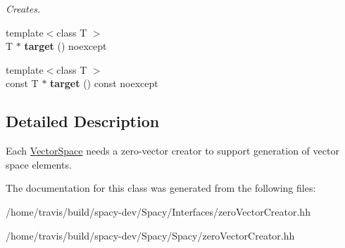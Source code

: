 \begin{DoxyCompactItemize}
\begin{DoxyCompactList}\small\item\em \-Creates. \end{DoxyCompactList}\item 
\hypertarget{classSpacy_1_1ZeroVectorCreator_ac6a6c8b0148da2ac7fc55fe1cc062321}{{\footnotesize template$<$class T $>$ }\\\-T $\ast$ {\bfseries target} () noexcept}\label{classSpacy_1_1ZeroVectorCreator_ac6a6c8b0148da2ac7fc55fe1cc062321}

\item 
\hypertarget{classSpacy_1_1ZeroVectorCreator_a49fff06a4dc43f027eef5db923d3aad4}{{\footnotesize template$<$class T $>$ }\\const \-T $\ast$ {\bfseries target} () const noexcept}\label{classSpacy_1_1ZeroVectorCreator_a49fff06a4dc43f027eef5db923d3aad4}

\end{DoxyCompactItemize}


\subsection{\-Detailed \-Description}
\-Each \hyperlink{classSpacy_1_1VectorSpace}{\-Vector\-Space} needs a zero-\/vector creator to support generation of vector space elements. 

\-The documentation for this class was generated from the following files\-:\begin{DoxyCompactItemize}
\item 
/home/travis/build/spacy-\/dev/\-Spacy/\-Interfaces/zero\-Vector\-Creator.\-hh\item 
/home/travis/build/spacy-\/dev/\-Spacy/\-Spacy/zero\-Vector\-Creator.\-hh\end{DoxyCompactItemize}
